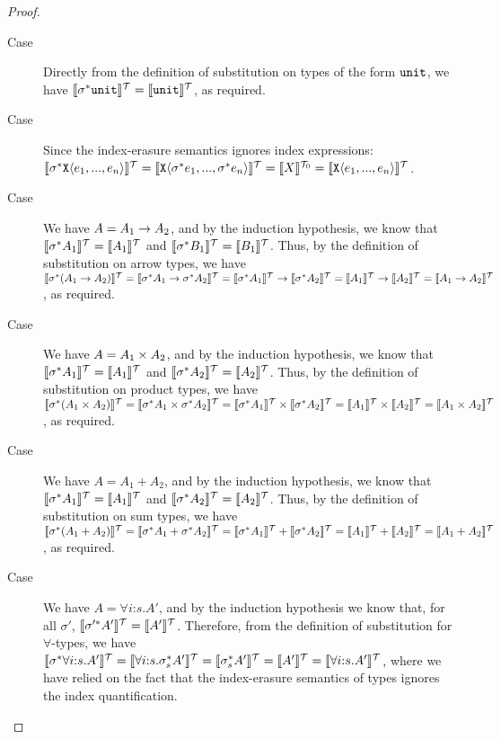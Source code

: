 \begin{proof}
\begin{enumerate}
\begin{description}
    \item[Case ] Directly from the definition of
      substitution on types of the form $\tyUnit$, we have
      $\tySem{\sigma^*\tyUnit} = \tySem{\tyUnit}$, as required.
    \item[Case ] Since the index-erasure semantics
      ignores index expressions:
      $\tySem{\sigma^*\tyPrim{X}{e_1,...,e_n}} =
      \tySem{\tyPrim{X}{\sigma^*e_1,...,\sigma^*e_n}} = \tyPrimSem{X}
      = \tySem{\tyPrim{X}{e_1,...,e_n}}$.
    \item[Case ] We have $A = A_1 \tyArr A_2$, and by
      the induction hypothesis, we know that $\tySem{\sigma^*A_1} =
      \tySem{A_1}$ and $\tySem{\sigma^*B_1} = \tySem{B_1}$. Thus, by
      the definition of substitution on arrow types, we have
      $\tySem{\sigma^*(A_1 \tyArr A_2)} = \tySem{\sigma^*A_1 \tyArr
        \sigma^*A_2} = \tySem{\sigma^*A_1} \to \tySem{\sigma^*A_2} =
      \tySem{A_1} \to \tySem{A_2} = \tySem{A_1 \tyArr A_2}$, as
      required.
    \item[Case ] We have $A = A_1 \tyProduct A_2$, and
      by the induction hypothesis, we know that $\tySem{\sigma^*A_1} =
      \tySem{A_1}$ and $\tySem{\sigma^*A_2} = \tySem{A_2}$. Thus, by
      the definition of substitution on product types, we have
      $\tySem{\sigma^*(A_1 \tyProduct A_2)} = \tySem{\sigma^*A_1
        \tyProduct \sigma^*A_2} = \tySem{\sigma^*A_1} \times
      \tySem{\sigma^*A_2} = \tySem{A_1} \times \tySem{A_2} =
      \tySem{A_1 \tyProduct A_2}$, as required.
    \item[Case ] We have $A = A_1 + A_2$, and by the
      induction hypothesis, we know that $\tySem{\sigma^*A_1} =
      \tySem{A_1}$ and $\tySem{\sigma^*A_2} = \tySem{A_2}$. Thus, by
      the definition of substitution on sum types, we have
      $\tySem{\sigma^*(A_1 + A_2)} = \tySem{\sigma^*A_1 + \sigma^*A_2}
      = \tySem{\sigma^*A_1} + \tySem{\sigma^*A_2} = \tySem{A_1} +
      \tySem{A_2} = \tySem{A_1 + A_2}$, as required.
    \item[Case ] We have $A = \forall
      i\mathord:s.A'$, and by the induction hypothesis we know that,
      for all $\sigma'$, $\tySem{\sigma'^*A'} =
      \tySem{A'}$. Therefore, from the definition of substitution for
      $\forall$-types, we have $\tySem{\sigma^*\forall i\mathord:s.A'}
      = \tySem{\forall i\mathord:s.\sigma_s^{*}A'} =
      \tySem{\sigma_s^{*}A'} = \tySem{A'} = \tySem{\forall
        i\mathord:s.A'}$, where we have relied on the fact that the
      index-erasure semantics of types ignores the index
      quantification.
    \end{description}
  \end{enumerate}
\end{proof}

